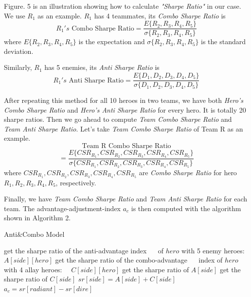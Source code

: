 \documentclass[letterpaper, 10 pt, conference]{ieeeconf}  %
\begin{document}
Figure. 5 is an illustration showing how to calculate \textit{"Sharpe Ratio"} in our case. We use $R_1$ as an example. $R_1$ has 4 teammates, its \textit{Combo Sharpe Ratio} is 
$$R_1's\text{ Combo Sharpe Ratio} = \frac{E\{R_2, R_3, R_4, R_5\}}{\sigma{\{R_2, R_3, R_4, R_5\}}}$$
where $E\{R_2, R_3, R_4, R_5\}$ is the expectation and $\sigma{\{R_2, R_3, R_4, R_5\}}$ is the standard deviation. 

Similarly, $R_1$ has 5 enemies, its \textit{Anti Sharpe Ratio} is 
$$R_1's\text{ Anti Sharpe Ratio} = \frac{E\{D_1, D_2, D_3, D_4, D_5\}}{\sigma{\{D_1, D_2, D_3, D_4, D_5\}}}$$

After repeating this method for all 10 heroes in two teams, we have both \textit{Hero's Combo Sharpe Ratio} and \textit{Hero's Anti Sharpe Ratio} for every hero. It is totally 20 sharpe ratios. Then we go ahead to compute \textit{Team Combo Sharpe Ratio} and \textit{Team Anti Sharpe Ratio}. Let's take \textit{Team Combo Sharpe Ratio} of Team R as an example.
$$\text{Team R Combo Sharpe Ratio}$$ 
$$= \frac{E\{CSR_{R_1}, CSR_{R_2}, CSR_{R_3}, CSR_{R_4}, CSR_{R_5}\}}{\sigma{\{CSR_{R_1}, CSR_{R_2}, CSR_{R_3}, CSR_{R_4}, CSR_{R_5}\}}}$$
where $CSR_{R_1}, CSR_{R_2}, CSR_{R_3}, CSR_{R_4}, CSR_{R_5}$ are \textit{Combo Sharpe Ratio} for hero $R_1, R_2, R_3, R_4, R_5$, respectively.



Finally, we have \textit{Team Combo Sharpe Ratio} and \textit{Team Anti Sharpe Ratio} for each team. The advantage-adjustment-index $a_c$ is then computed with the algorithm shown in Algorithm 2.

\begin{algorithm}
   \caption{Anti\&Combo Model}
    \begin{algorithmic}

                \State get the sharpe ratio of the anti-advantage index
                \State $\quad$ of $hero$ with 5 enemy heroes: $A[side][hero]$
                \State get the sharpe ratio of the combo-advantage
                \State $\quad$ index of $hero$ with 4 allay heroes:
                \State $\quad C[side][hero]$
            \EndFor 
        \State get the sharpe ratio of $A[side]$
        \State get the sharpe ratio of $C[side]$
        \State $sr[side] = A[side]+C[side]$
        \EndFor
        \State $a_c = sr[radiant]-sr[dire]$
     \EndFunction
\end{algorithmic}
\end{algorithm}
\end{document}
